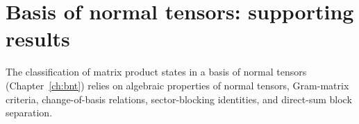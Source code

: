 \chapter{Basis of normal tensors: supporting results}
\label{ch:bnt_supporting_results}

The classification of matrix product states in a basis of normal tensors
(Chapter~\ref{ch:bnt}) relies on algebraic properties of normal tensors,
Gram-matrix criteria, change-of-basis relations, sector-blocking identities,
and direct-sum block separation.




